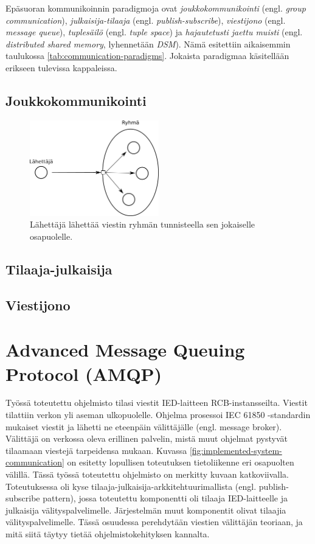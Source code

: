 Epäsuoran kommunikoinnin paradigmoja ovat \emph{joukkokommunikointi} (engl. \emph{group communication}), \emph{julkaisija-tilaaja} (engl. \emph{publish-subscribe}), \emph{viestijono} (engl. \emph{message queue}), \emph{tuplesäilö} (engl. \emph{tuple space}) ja \emph{hajautetusti jaettu muisti} (engl. \emph{distributed shared memory}, lyhennetään \emph{DSM}). Nämä esitettiin aikaisemmin taulukossa \ref{tab:communication-paradigms}. Jokaista paradigmaa käsitellään erikseen tulevissa kappaleissa.


\subsection{Joukkokommunikointi}
\begin{figure}[ht!]
	\includegraphics[width=0.5\textwidth]{pictures/group-communication.png}
	\caption{Lähettäjä lähettää viestin ryhmän tunnisteella sen jokaiselle osapuolelle.}
	\label{fig:group-communication}
\end{figure}


\subsection{Tilaaja-julkaisija}



\subsection{Viestijono}



\section{Advanced Message Queuing Protocol (AMQP)}
\label{ch:amqp-theory}
Työssä toteutettu ohjelmisto tilasi viestit IED-laitteen RCB-instansseilta. Viestit tilattiin verkon yli aseman ulkopuolelle. Ohjelma prosessoi IEC 61850 -standardin mukaiset viestit ja lähetti ne eteenpäin välittäjälle (engl. message broker). Välittäjä on verkossa oleva erillinen palvelin, mistä muut ohjelmat pystyvät tilaamaan viestejä tarpeidensa mukaan. Kuvassa \ref{fig:implemented-system-communication} on esitetty lopullisen toteutuksen tietoliikenne eri osapuolten välillä. Tässä työssä toteutettu ohjelmisto on merkitty kuvaan katkoviivalla. Toteutuksessa oli kyse tilaaja-julkaisija-arkkitehtuurimallista (engl. publish-subscribe pattern), jossa toteutettu komponentti oli tilaaja IED-laitteelle ja julkaisija välityspalvelimelle. Järjestelmän muut komponentit olivat tilaajia välityspalvelimelle. Tässä osuudessa perehdytään viestien välittäjän teoriaan, ja mitä siitä täytyy tietää ohjelmistokehityksen kannalta.

